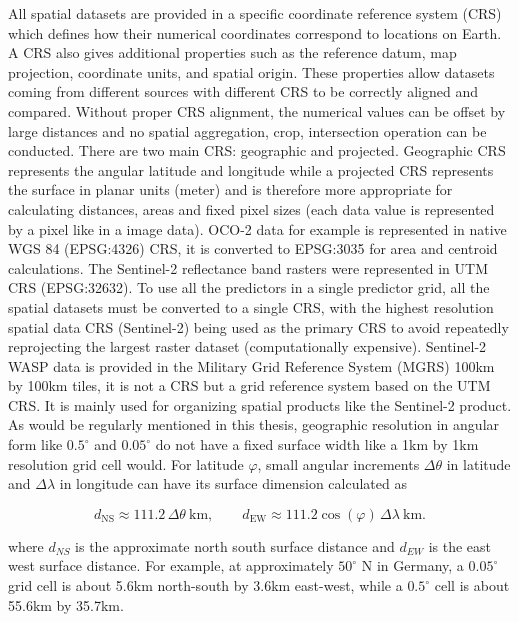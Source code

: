 All spatial datasets are provided in a specific coordinate reference system (CRS) which defines how their numerical coordinates correspond to locations on Earth. A CRS also gives additional properties such as the reference datum, map projection, coordinate units, and spatial origin. These properties allow datasets coming from different sources with different CRS to be correctly aligned and compared. Without proper CRS alignment, the numerical values can be offset by large distances and no spatial aggregation, crop, intersection operation can be conducted. There are two main CRS: geographic and projected. Geographic CRS represents the angular latitude and longitude while a projected CRS represents the surface in planar units (meter) and is therefore more appropriate for calculating distances, areas and fixed pixel sizes (each data value is represented by a pixel like in a image data). OCO-2 data for example is represented in native WGS 84 (EPSG:4326) CRS, it is converted to EPSG:3035 for area and centroid calculations. The Sentinel-2 reflectance band rasters were represented in UTM CRS (EPSG:32632). To use all the predictors in a single predictor grid, all the spatial datasets must be converted to a single CRS, with the highest resolution spatial data CRS (Sentinel-2) being used as the primary CRS to avoid repeatedly reprojecting the largest raster dataset (computationally expensive). Sentinel-2 WASP data is provided in the Military Grid Reference System (MGRS) 100km by 100km tiles, it is not a CRS but a grid reference system based on the UTM CRS. It is mainly used for organizing spatial products like the Sentinel-2 product. As would be regularly mentioned in this thesis, geographic resolution in angular form like \(0.5^{\circ}\) and \(0.05^{\circ}\) do not have a fixed surface width like a 1km by 1km resolution grid cell would. For latitude \(\varphi\), small angular increments \(\Delta\theta\) in latitude and \(\Delta\lambda\) in longitude can have its surface dimension calculated as 

\begin{equation}
d_{\mathrm{NS}}\approx111.2\,\Delta\theta\ \mathrm{km},
\qquad
d_{\mathrm{EW}}\approx111.2\cos(\varphi)\,\Delta\lambda\ \mathrm{km}.
\label{eq:degree_ground_distance}
\end{equation}

where $d_{NS}$ is the approximate north south surface distance and $d_{EW}$ is the east west surface distance. For example, at approximately \(50^{\circ}\) N in Germany, a \(0.05^{\circ}\) grid cell is about 5.6km north-south by 3.6km east-west, while a \(0.5^{\circ}\) cell is about 55.6km by 35.7km.

